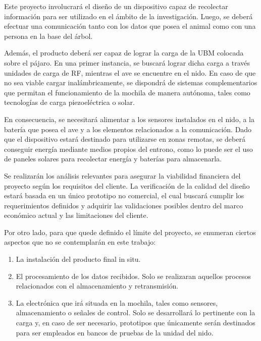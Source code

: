 Este proyecto involucrará el diseño de un dispositivo capaz de recolectar información para ser utilizado en el ámbito de la investigación. Luego, se deberá efectuar una comunicación tanto con los datos que posea el animal como con una persona en la base del árbol.

Además, el producto deberá ser capaz de lograr la carga de la UBM colocada sobre el pájaro. En una primer instancia, se buscará lograr dicha carga a través unidades de carga de RF, mientras el ave se encuentre en el nido. En caso de que no sea viable cargar inalámbricamente, se dispondrá de sistemas complementarios que permitan el funcionamiento de la mochila de manera autónoma, tales como tecnologías de carga piezoeléctrica o solar. 

En consecuencia, se necesitará alimentar a los sensores instalados en el nido, a la batería que posea el ave y a los elementos relacionados a la comunicación. Dado que el dispositivo estará destinado para utilizarse en zonas remotas, se deberá conseguir energía mediante medios propios del entrono, como lo puede ser el uso de paneles solares para recolectar energía y baterías para almacenarla.

Se realizarán los análisis relevantes para asegurar la viabilidad financiera del proyecto según los requisitos del cliente. La verificación de la calidad del diseño estará basada en un único prototipo no comercial, el cual buscará cumplir los requerimientos definidos y adquirir las validaciones posibles dentro del marco económico actual y las limitaciones del cliente. 


Por otro lado, para que quede definido el límite del proyecto, se enumeran ciertos aspectos que no se contemplarán en este trabajo:
\begin{enumerate}
	\item La instalación del producto final in situ.
	\item El procesamiento de los datos recibidos. Solo se realizaran aquellos procesos relacionados con el almacenamiento y retransmisión.
	\item La electrónica que irá situada en la mochila, tales como sensores, almacenamiento o señales de control. Solo se desarrollará lo pertinente con la carga y, en caso de ser necesario, prototipos que únicamente serán destinados para ser empleados en bancos de pruebas de la unidad del nido. 
\end{enumerate}

